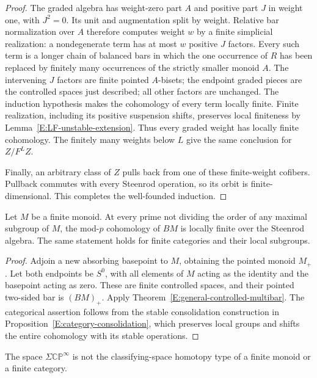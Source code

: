 \begin{proof}
The graded algebra has weight-zero part $A$ and positive part $J$
in weight one, with $J^2=0$.  Its unit and augmentation split by
weight.  Relative bar normalization over $A$ therefore computes
weight $w$ by a finite simplicial realization: a nondegenerate term
has at most $w$ positive $J$ factors.  Every such term is a longer
chain of balanced bars in which the one occurrence of $R$ has been
replaced by finitely many occurrences of the strictly smaller monoid
$A$.  The intervening $J$ factors are finite pointed $A$-bisets;
the endpoint graded pieces are the controlled spaces just described;
all other factors are unchanged.  The induction hypothesis makes
the cohomology of every term locally finite.  Finite realization,
including its positive suspension shifts, preserves local finiteness
by Lemma~\ref{E:LF-unstable-extension}.  Thus every graded weight has
locally finite cohomology.  The finitely many weights below $L$ give
the same conclusion for $Z/F^LZ$.

Finally, an arbitrary class of $Z$ pulls back from one of these
finite-weight cofibers.  Pullback commutes with every Steenrod
operation, so its orbit is finite-dimensional.  This completes the
well-founded induction.
\end{proof}

\begin{corollary}\label{E:general-good-prime-LF}
Let $M$ be a finite monoid.  At every prime not dividing the order
of any maximal subgroup of $M$, the mod-$p$ cohomology of $BM$ is
locally finite over the Steenrod algebra.  The same statement holds
for finite categories and their local subgroups.
\end{corollary}

\begin{proof}
Adjoin a new absorbing basepoint to $M$, obtaining the pointed monoid
$M_+$.  Let both endpoints be $S^0$, with all elements of $M$ acting
as the identity and the basepoint acting as zero.  These are finite
controlled spaces, and their pointed two-sided bar is $(BM)_+$.
Apply Theorem~\ref{E:general-controlled-multibar}.  The categorical
assertion follows from the stable consolidation construction in
Proposition~\ref{E:category-consolidation}, which preserves local
groups and shifts the entire cohomology with its stable operations.
\end{proof}

\begin{corollary}\label{E:Sigma-CP-infty-excluded}
The space $\Sigma\mathbb{CP}^{\infty}$ is not the classifying-space
homotopy type of a finite monoid or a finite category.
\end{corollary}


